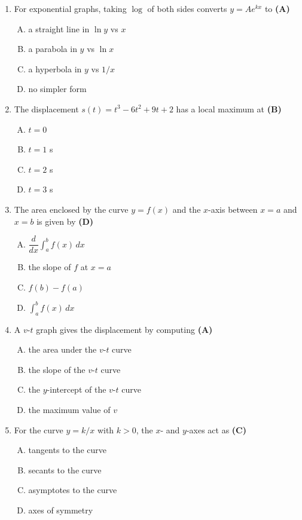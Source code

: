 \documentclass[10pt,a4paper]{article}
\begin{document}
\begin{enumerate}[1.]
\item For exponential graphs, taking $\log$ of both sides converts $y = Ae^{kx}$ to \hfill \textbf{(A)}
\begin{enumerate}[(A)]
    \item a straight line in $\ln y$ vs $x$
    \item a parabola in $y$ vs $\ln x$
    \item a hyperbola in $y$ vs $1/x$
    \item no simpler form
\end{enumerate}

\item The displacement $s(t) = t^3 - 6t^2 + 9t + 2$ has a local maximum at \hfill \textbf{(B)}
\begin{enumerate}[(A)]
    \item $t = 0$
    \item $t = 1$ s
    \item $t = 2$ s
    \item $t = 3$ s
\end{enumerate}

\item The area enclosed by the curve $y = f(x)$ and the $x$-axis between $x=a$ and $x=b$ is given by \hfill \textbf{(D)}
\begin{enumerate}[(A)]
    \item $\dfrac{d}{dx}\displaystyle\int_a^b f(x)\,dx$
    \item the slope of $f$ at $x=a$
    \item $f(b) - f(a)$
    \item $\displaystyle\int_a^b f(x)\,dx$
\end{enumerate}

\item A $v$-$t$ graph gives the displacement by computing \hfill \textbf{(A)}
\begin{enumerate}[(A)]
    \item the area under the $v$-$t$ curve
    \item the slope of the $v$-$t$ curve
    \item the $y$-intercept of the $v$-$t$ curve
    \item the maximum value of $v$
\end{enumerate}

\item For the curve $y = k/x$ with $k > 0$, the $x$- and $y$-axes act as \hfill \textbf{(C)}
\begin{enumerate}[(A)]
    \item tangents to the curve
    \item secants to the curve
    \item asymptotes to the curve
    \item axes of symmetry
\end{enumerate}


\end{enumerate}
\end{document}
